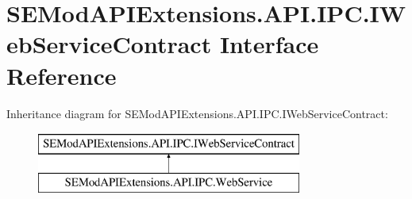 \hypertarget{interface_s_e_mod_a_p_i_extensions_1_1_a_p_i_1_1_i_p_c_1_1_i_web_service_contract}{}\section{S\+E\+Mod\+A\+P\+I\+Extensions.\+A\+P\+I.\+I\+P\+C.\+I\+Web\+Service\+Contract Interface Reference}
\label{interface_s_e_mod_a_p_i_extensions_1_1_a_p_i_1_1_i_p_c_1_1_i_web_service_contract}
Inheritance diagram for S\+E\+Mod\+A\+P\+I\+Extensions.\+A\+P\+I.\+I\+P\+C.\+I\+Web\+Service\+Contract\+:\begin{figure}[H]
\begin{center}
\leavevmode
\includegraphics[height=2.000000cm]{interface_s_e_mod_a_p_i_extensions_1_1_a_p_i_1_1_i_p_c_1_1_i_web_service_contract}
\end{center}
\end{figure}
